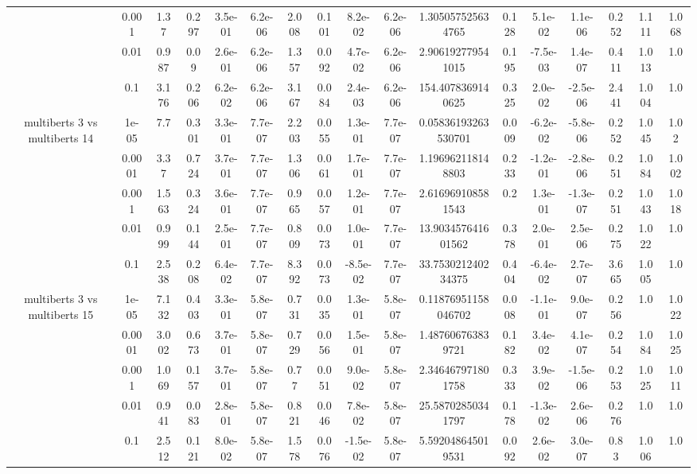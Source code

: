 \begin{tabular}{|c|c|c|c|c|c|c|c|c|c|c|c|c|c|c|c|c|}
 & 0.001 & 1.37 & 0.297 & 3.5e-01 & 6.2e-06 & 2.008 & 0.101 & 8.2e-02 & 6.2e-06 & 1.305057525634765 & 0.128 & 5.1e-02 & 1.1e-06 & 0.252 & 1.111 & 1.068 \\
 & 0.01 & 0.987 & 0.09 & 2.6e-01 & 6.2e-06 & 1.357 & 0.092 & 4.7e-02 & 6.2e-06 & 2.906192779541015 & 0.195 & -7.5e-03 & 1.4e-07 & 0.411 & 1.013 & 1.0 \\
 & 0.1 & 3.176 & 0.206 & 6.2e-02 & 6.2e-06 & 3.167 & 0.084 & 2.4e-03 & 6.2e-06 & 154.4078369140625 & 0.325 & 2.0e-02 & -2.5e-06 & 2.441 & 1.004 & 1.0 \\
\hline
\multirow{5}{*}{multiberts 3 vs multiberts 14} & 1e-05 & 7.7 & 0.301 & 3.3e-01 & 7.7e-07 & 2.203 & 0.055 & 1.3e-01 & 7.7e-07 & 0.05836193263530701 & 0.009 & -6.2e-02 & -5.8e-06 & 0.252 & 1.045 & 1.02 \\
 & 0.0001 & 3.37 & 0.724 & 3.7e-01 & 7.7e-07 & 1.306 & 0.061 & 1.7e-01 & 7.7e-07 & 1.196962118148803 & 0.233 & -1.2e-01 & -2.8e-06 & 0.251 & 1.084 & 1.002 \\
 & 0.001 & 1.563 & 0.324 & 3.6e-01 & 7.7e-07 & 0.965 & 0.057 & 1.2e-01 & 7.7e-07 & 2.616969108581543 & 0.2 & 1.3e-01 & -1.3e-07 & 0.251 & 1.043 & 1.018 \\
 & 0.01 & 0.999 & 0.144 & 2.5e-01 & 7.7e-07 & 0.809 & 0.073 & 1.0e-01 & 7.7e-07 & 13.903457641601562 & 0.378 & 2.0e-01 & 2.5e-06 & 0.275 & 1.022 & 1.0 \\
 & 0.1 & 2.538 & 0.208 & 6.4e-02 & 7.7e-07 & 8.392 & 0.073 & -8.5e-02 & 7.7e-07 & 33.753021240234375 & 0.404 & -6.4e-02 & 2.7e-07 & 3.665 & 1.005 & 1.0 \\
\hline
\multirow{5}{*}{multiberts 3 vs multiberts 15} & 1e-05 & 7.132 & 0.403 & 3.3e-01 & 5.8e-07 & 0.731 & 0.035 & 1.3e-01 & 5.8e-07 & 0.11876951158046702 & 0.008 & -1.1e-01 & 9.0e-07 & 0.256 & 1.0 & 1.022 \\
 & 0.0001 & 3.002 & 0.673 & 3.7e-01 & 5.8e-07 & 0.729 & 0.056 & 1.5e-01 & 5.8e-07 & 1.487606763839721 & 0.182 & 3.4e-02 & 4.1e-07 & 0.254 & 1.084 & 1.025 \\
 & 0.001 & 1.069 & 0.157 & 3.7e-01 & 5.8e-07 & 0.77 & 0.051 & 9.0e-02 & 5.8e-07 & 2.346467971801758 & 0.333 & 3.9e-02 & -1.5e-06 & 0.253 & 1.025 & 1.011 \\
 & 0.01 & 0.941 & 0.083 & 2.8e-01 & 5.8e-07 & 0.821 & 0.046 & 7.8e-02 & 5.8e-07 & 25.58702850341797 & 0.178 & -1.3e-02 & 2.6e-06 & 0.276 & 1.0 & 1.0 \\
 & 0.1 & 2.512 & 0.121 & 8.0e-02 & 5.8e-07 & 1.578 & 0.076 & -1.5e-02 & 5.8e-07 & 5.592048645019531 & 0.092 & 2.6e-02 & 3.0e-07 & 0.83 & 1.006 & 1.0 \\

\end{tabular}
